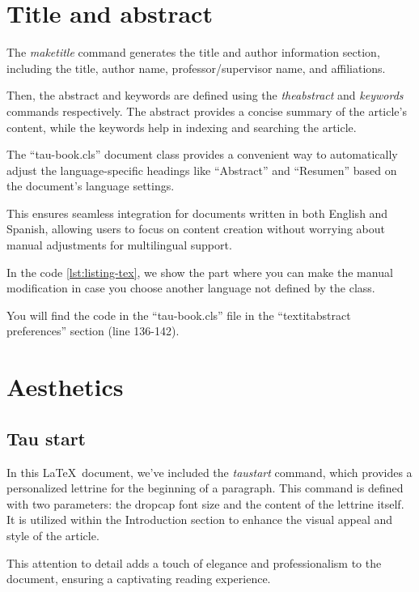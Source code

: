 \documentclass[10pt,a4paper,twoside]{tau-book}
\begin{document}
\section{Title and abstract}

    The \textit{maketitle} command generates the title and author information section, including the title, author name, professor/supervisor name, and affiliations.

    Then, the abstract and keywords are defined using the \textit{theabstract} and \textit{keywords} commands respectively. The abstract provides a concise summary of the article's content, while the keywords help in indexing and searching the article.

    The ``tau-book.cls'' document class provides a convenient way to automatically adjust the language-specific headings like ``Abstract'' and ``Resumen'' based on the document's language settings.

    This ensures seamless integration for documents written in both English and Spanish, allowing users to focus on content creation without worrying about manual adjustments for multilingual support.

    

    In the code \ref{lst:listing-tex}, we show the part where you can make the manual modification in case you choose another language not defined by the class.


    You will find the code in the ``tau-book.cls'' file in the ``textit{abstract preferences}'' section (line 136-142).

\section{Aesthetics}

    \subsection{Tau start}

        In this \LaTeX\ document, we've included the \textit{taustart} command, which provides a personalized lettrine for the beginning of a paragraph. This command is defined with two parameters: the dropcap font size and the content of the lettrine itself. It is utilized within the Introduction section to enhance the visual appeal and style of the article.

        This attention to detail adds a touch of elegance and professionalism to the document, ensuring a captivating reading experience.
\end{document}
